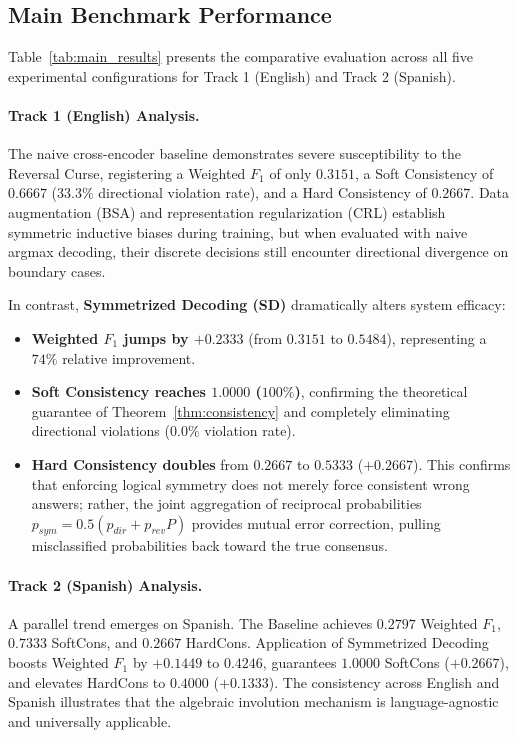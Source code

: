 \documentclass[11pt,a4paper,twocolumn]{article}
\begin{document}
\subsection{Main Benchmark Performance}
Table~\ref{tab:main_results} presents the comparative evaluation across all five experimental configurations for Track 1 (English) and Track 2 (Spanish).

\paragraph{Track 1 (English) Analysis.}
The naive cross-encoder baseline demonstrates severe susceptibility to the Reversal Curse, registering a Weighted $F_1$ of only $0.3151$, a Soft Consistency of $0.6667$ ($33.3\%$ directional violation rate), and a Hard Consistency of $0.2667$. Data augmentation (BSA) and representation regularization (CRL) establish symmetric inductive biases during training, but when evaluated with naive argmax decoding, their discrete decisions still encounter directional divergence on boundary cases.

In contrast, \textbf{Symmetrized Decoding (SD)} dramatically alters system efficacy:
\begin{itemize}
    \item \textbf{Weighted $F_1$ jumps by $+0.2333$} (from $0.3151$ to \textbf{$0.5484$}), representing a $74\%$ relative improvement.
    \item \textbf{Soft Consistency reaches $1.0000$ ($100\%$)}, confirming the theoretical guarantee of Theorem~\ref{thm:consistency} and completely eliminating directional violations ($0.0\%$ violation rate).
    \item \textbf{Hard Consistency doubles} from $0.2667$ to \textbf{$0.5333$} ($+0.2667$). This confirms that enforcing logical symmetry does not merely force consistent wrong answers; rather, the joint aggregation of reciprocal probabilities $p_{sym} = 0.5(p_{dir} + p_{rev} P)$ provides mutual error correction, pulling misclassified probabilities back toward the true consensus.
\end{itemize}

\paragraph{Track 2 (Spanish) Analysis.}
A parallel trend emerges on Spanish. The Baseline achieves $0.2797$ Weighted $F_1$, $0.7333$ SoftCons, and $0.2667$ HardCons. Application of Symmetrized Decoding boosts Weighted $F_1$ by $+0.1449$ to \textbf{$0.4246$}, guarantees \textbf{$1.0000$} SoftCons ($+0.2667$), and elevates HardCons to \textbf{$0.4000$} ($+0.1333$). The consistency across English and Spanish illustrates that the algebraic involution mechanism is language-agnostic and universally applicable.
\end{document}
